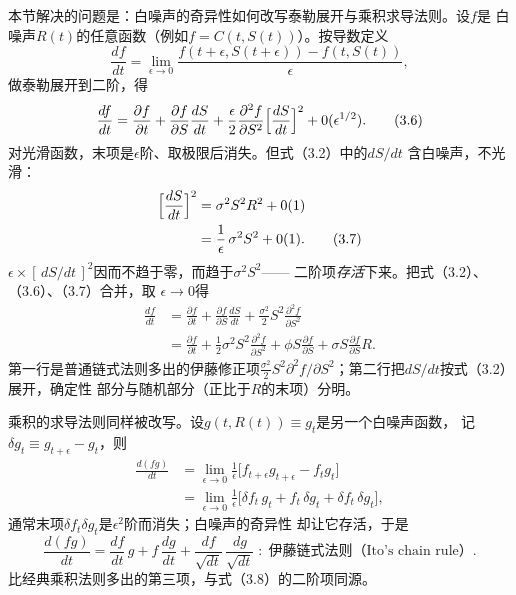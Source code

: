 本节解决的问题是：白噪声的奇异性如何改写泰勒展开与乘积求导法则。设$f$是
白噪声$R(t)$的任意函数（例如$f=C(t,S(t))$）。按导数定义
\begin{equation*}
\frac{df}{dt}=\lim_{\epsilon\to 0}\frac{f(t+\epsilon,S(t+\epsilon))-f(t,S(t))}{\epsilon},
\end{equation*}
做泰勒展开到二阶，得
\begin{equation*}
\frac{df}{dt}=\frac{\partial f}{\partial t}
+\frac{\partial f}{\partial S}\frac{dS}{dt}
+\frac{\epsilon}{2}\frac{\partial^{2}f}{\partial S^{2}}
\Bigl[\frac{dS}{dt}\Bigr]^{2}+0(\epsilon^{1/2}).
\tag{3.6}
\end{equation*}
对光滑函数，末项是$\epsilon$阶、取极限后消失。但式（3.2）中的$dS/dt$
含白噪声，不光滑：
\begin{align*}
\Bigl[\frac{dS}{dt}\Bigr]^{2}
&=\sigma^{2}S^{2}R^{2}+0(1)\\
&=\frac{1}{\epsilon}\,\sigma^{2}S^{2}+0(1).
\tag{3.7}
\end{align*}
$\epsilon\times[\,dS/dt\,]^2$因而不趋于零，而趋于$\sigma^{2}S^{2}$——
二阶项\emph{存活}下来。把式（3.2）、（3.6）、（3.7）合并，取
$\epsilon\to 0$得
\begin{align*}
\frac{df}{dt}
&=\frac{\partial f}{\partial t}
+\frac{\partial f}{\partial S}\frac{dS}{dt}
+\frac{\sigma^{2}}{2}S^{2}\frac{\partial^{2}f}{\partial S^{2}}\\
&=\frac{\partial f}{\partial t}
+\frac{1}{2}\sigma^{2}S^{2}\frac{\partial^{2}f}{\partial S^{2}}
+\phi S\frac{\partial f}{\partial S}
+\sigma S\frac{\partial f}{\partial S}R.
\tag{3.8}
\end{align*}
第一行是普通链式法则多出的伊藤修正项$\frac{\sigma^{2}}{2}S^{2}
\partial^{2}f/\partial S^{2}$；第二行把$dS/dt$按式（3.2）展开，确定性
部分与随机部分（正比于$R$的末项）分明。

乘积的求导法则同样被改写。设$g(t,R(t))\equiv g_t$是另一个白噪声函数，
记$\delta g_t\equiv g_{t+\epsilon}-g_t$，则
\begin{align*}
\frac{d(fg)}{dt}
&=\lim_{\epsilon\to 0}\frac{1}{\epsilon}\bigl[f_{t+\epsilon}g_{t+\epsilon}-f_tg_t\bigr]\\
&=\lim_{\epsilon\to 0}\frac{1}{\epsilon}\bigl[\delta f_t\,g_t+f_t\,\delta g_t+\delta f_t\,\delta g_t\bigr],
\end{align*}
通常末项$\delta f_t\delta g_t$是$\epsilon^{2}$阶而消失；白噪声的奇异性
却让它存活，于是
\begin{equation*}
\frac{d(fg)}{dt}=\frac{df}{dt}\,g+f\,\frac{dg}{dt}
+\frac{df}{\sqrt{dt}}\,\frac{dg}{\sqrt{dt}}
\;:\;\text{伊藤链式法则（Ito's chain rule）}.
\tag{3.9}
\end{equation*}
比经典乘积法则多出的第三项，与式（3.8）的二阶项同源。


